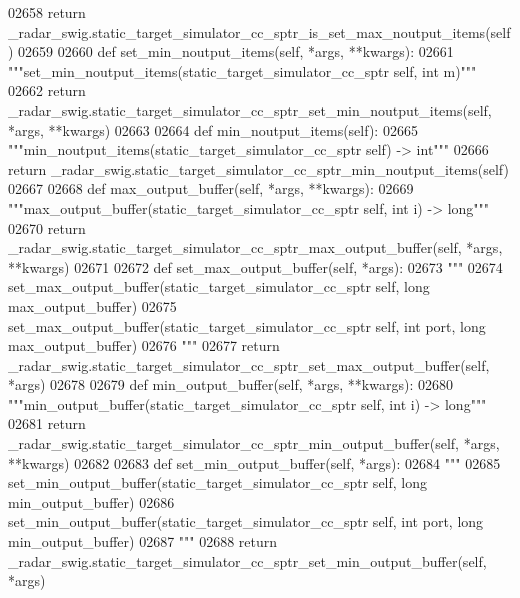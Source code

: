\begin{DoxyCode}
{{{{{{{{{{02658         \textcolor{keywordflow}{return} \_radar\_swig.static\_target\_simulator\_cc\_sptr\_is\_set\_max\_noutput\_items(self)
02659 
02660     \textcolor{keyword}{def }set_min_noutput_items(self, *args, **kwargs):
02661         \textcolor{stringliteral}{"""set\_min\_noutput\_items(static\_target\_simulator\_cc\_sptr self, int m)"""}
02662         \textcolor{keywordflow}{return} \_radar\_swig.static\_target\_simulator\_cc\_sptr\_set\_min\_noutput\_items(self, *args, **kwargs)
02663 
02664     \textcolor{keyword}{def }min_noutput_items(self):
02665         \textcolor{stringliteral}{"""min\_noutput\_items(static\_target\_simulator\_cc\_sptr self) -> int"""}
02666         \textcolor{keywordflow}{return} \_radar\_swig.static\_target\_simulator\_cc\_sptr\_min\_noutput\_items(self)
02667 
02668     \textcolor{keyword}{def }max_output_buffer(self, *args, **kwargs):
02669         \textcolor{stringliteral}{"""max\_output\_buffer(static\_target\_simulator\_cc\_sptr self, int i) -> long"""}
02670         \textcolor{keywordflow}{return} \_radar\_swig.static\_target\_simulator\_cc\_sptr\_max\_output\_buffer(self, *args, **kwargs)
02671 
02672     \textcolor{keyword}{def }set_max_output_buffer(self, *args):
02673         \textcolor{stringliteral}{"""}
02674 \textcolor{stringliteral}{        set\_max\_output\_buffer(static\_target\_simulator\_cc\_sptr self, long max\_output\_buffer)}
02675 \textcolor{stringliteral}{        set\_max\_output\_buffer(static\_target\_simulator\_cc\_sptr self, int port, long max\_output\_buffer)}
02676 \textcolor{stringliteral}{        """}
02677         \textcolor{keywordflow}{return} \_radar\_swig.static\_target\_simulator\_cc\_sptr\_set\_max\_output\_buffer(self, *args)
02678 
02679     \textcolor{keyword}{def }min_output_buffer(self, *args, **kwargs):
02680         \textcolor{stringliteral}{"""min\_output\_buffer(static\_target\_simulator\_cc\_sptr self, int i) -> long"""}
02681         \textcolor{keywordflow}{return} \_radar\_swig.static\_target\_simulator\_cc\_sptr\_min\_output\_buffer(self, *args, **kwargs)
02682 
02683     \textcolor{keyword}{def }set_min_output_buffer(self, *args):
02684         \textcolor{stringliteral}{"""}
02685 \textcolor{stringliteral}{        set\_min\_output\_buffer(static\_target\_simulator\_cc\_sptr self, long min\_output\_buffer)}
02686 \textcolor{stringliteral}{        set\_min\_output\_buffer(static\_target\_simulator\_cc\_sptr self, int port, long min\_output\_buffer)}
02687 \textcolor{stringliteral}{        """}
02688         \textcolor{keywordflow}{return} \_radar\_swig.static\_target\_simulator\_cc\_sptr\_set\_min\_output\_buffer(self, *args)
}}}}}}}}}}
\end{DoxyCode}
